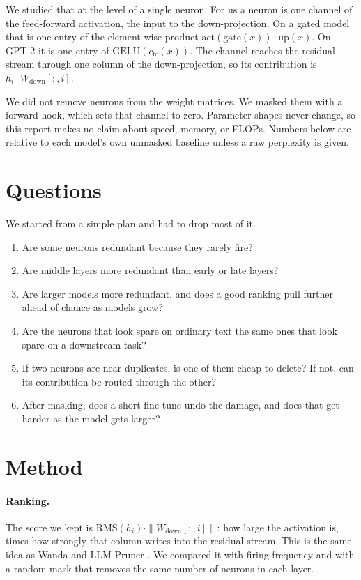 \documentclass{article}
\begin{document}
We studied that at the level of a single neuron.
For us a neuron is one channel of the feed-forward activation, the input to the down-projection.
On a gated model that is one entry of the element-wise product $\mathrm{act}(\mathrm{gate}(x)) \cdot \mathrm{up}(x)$.
On GPT-2 it is one entry of $\mathrm{GELU}(c_{\mathrm{fc}}(x))$.
The channel reaches the residual stream through one column of the down-projection, so its contribution is $h_i \cdot W_{\mathrm{down}}[:, i]$.

We did not remove neurons from the weight matrices.
We masked them with a forward hook, which sets that channel to zero.
Parameter shapes never change, so this report makes no claim about speed, memory, or FLOPs.
Numbers below are relative to each model's own unmasked baseline unless a raw perplexity is given.

\section{Questions}
\label{sec:questions}

We started from a simple plan and had to drop most of it.
\begin{enumerate}
  \item Are some neurons redundant because they rarely fire?
  \item Are middle layers more redundant than early or late layers?
  \item Are larger models more redundant, and does a good ranking pull further ahead of chance as models grow?
  \item Are the neurons that look spare on ordinary text the same ones that look spare on a downstream task?
  \item If two neurons are near-duplicates, is one of them cheap to delete? If not, can its contribution be routed through the other?
  \item After masking, does a short fine-tune undo the damage, and does that get harder as the model gets larger?
\end{enumerate}

\section{Method}
\label{sec:method}

\paragraph{Ranking.}
The score we kept is $\mathrm{RMS}(h_i) \cdot \|W_{\mathrm{down}}[:, i]\|$: how large the activation is, times how strongly that column writes into the residual stream.
This is the same idea as Wanda \citep{sun2024wanda} and LLM-Pruner \citep{ma2023llmpruner}.
We compared it with firing frequency and with a random mask that removes the same number of neurons in each layer.
\end{document}
